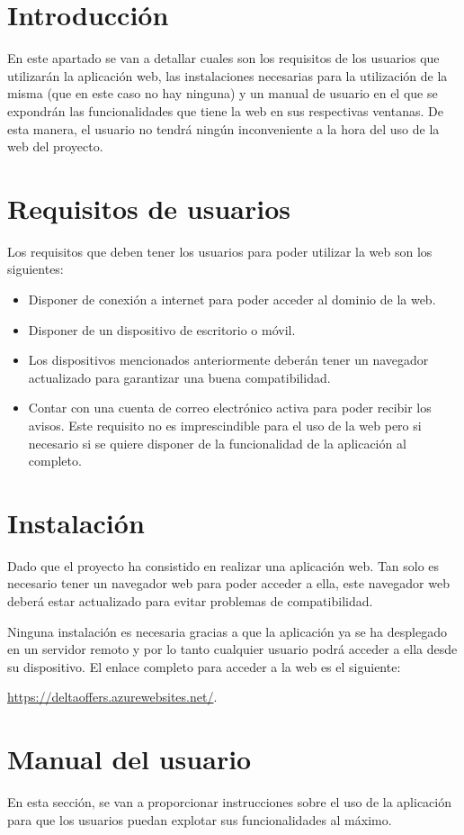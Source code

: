 \section{Introducción}
En este apartado se van a detallar cuales son los requisitos de los usuarios que utilizarán la aplicación web, las instalaciones necesarias para la utilización de la misma (que en este caso no hay ninguna) y un manual de usuario en el que se expondrán las funcionalidades que tiene la web en sus respectivas ventanas. De esta manera, el usuario no tendrá ningún inconveniente a la hora del uso de la web del proyecto.
\section{Requisitos de usuarios}
Los requisitos que deben tener los usuarios para poder utilizar la web son los siguientes:

\begin{itemize}
\item Disponer de conexión a internet para poder acceder al dominio de la web.
\item Disponer de un dispositivo de escritorio o móvil.
\item Los dispositivos mencionados anteriormente deberán tener un navegador actualizado para garantizar una buena compatibilidad.
\item Contar con una cuenta de correo electrónico activa para poder recibir los avisos. Este requisito no es imprescindible para el uso de la web pero si necesario si se quiere disponer de la funcionalidad de la aplicación al completo.
\end{itemize}
\section{Instalación}
Dado que el proyecto ha consistido en realizar una aplicación web. Tan solo es necesario tener un navegador web para poder acceder a ella, este navegador web deberá estar actualizado para evitar problemas de compatibilidad. 

Ninguna instalación es necesaria gracias a que la aplicación ya se ha desplegado en un servidor remoto y por lo tanto cualquier usuario podrá acceder a ella desde su dispositivo. El enlace completo para acceder a la web es el siguiente:

\url{https://deltaoffers.azurewebsites.net/}\label{enlace:web}.

\section{Manual del usuario}
En esta sección, se van a proporcionar instrucciones sobre el uso de la aplicación para que los usuarios puedan explotar sus funcionalidades al máximo.

